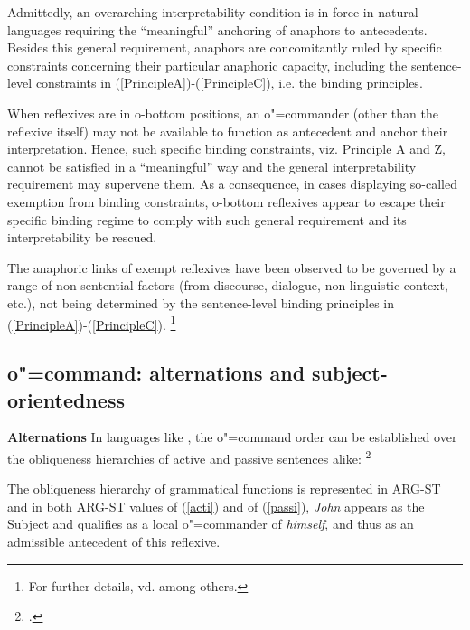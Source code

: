 \documentclass[output=paper
,modfonts
,nonflat]{langsci/langscibook}
\begin{document}
Admittedly, an overarching interpretability condition is in force in natural languages
requiring the ``meaningful'' anchoring of anaphors to antecedents. Besides this general 
requirement, anaphors are concomitantly ruled by specific constraints concerning their 
particular anaphoric capacity, including the sentence-level constraints in (\ref{PrincipleA})-(\ref{PrincipleC}), i.e. the binding principles.

When reflexives are in o-bottom positions, an o"=commander (other than the reflexive itself) may not be
available to function as antecedent and anchor their interpretation. Hence, such specific
binding constraints, viz. Principle A and Z, cannot be satisfied in a ``meaningful'' way and the general
interpretability requirement may supervene them. As a consequence, in cases displaying so-called
exemption from binding constraints, o-bottom reflexives appear to escape their specific binding regime
to comply with such general requirement and its interpretability be rescued. 

The anaphoric links of exempt reflexives have been observed to be
governed by a range of non sentential factors (from discourse, dialogue, non linguistic context,
etc.), not being determined by the sentence-level binding principles in (\ref{PrincipleA})-(\ref{PrincipleC}).%
%
\footnote{For further details, vd. \citep{kuno:func87, zribi:pview89, golde:diss99} among others.
} 


\subsection{o"=command: alternations and subject-orientedness}\label{ocommand}

\textbf{Alternations} In languages like , the o"=command order can be established over the
obliqueness hierarchies of active and passive sentences alike:%
%
\footnote{
\citep{Jackendoff72a-u, polsag:hpsg94}.}


\begin{exe}
\ex
\begin{xlist}
\label{acti}
\label{passi}
\end{xlist}
\end{exe}

The obliqueness hierarchy of grammatical functions is represented in ARG-ST 
and in both ARG-ST values of (\ref{acti}) and of (\ref{passi}), {\em John}
appears as the Subject and qualifies as a local o"=commander of {\em himself},
and thus as an admissible antecedent of this reflexive.
\end{document}
